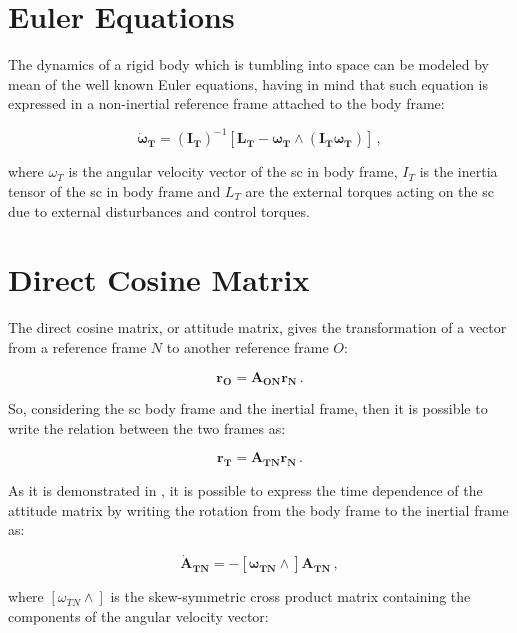\section{Euler Equations}

The dynamics of a rigid body which is tumbling into space can be modeled by mean of the well known Euler equations, having in mind that such equation is expressed in a non-inertial reference frame attached to the body frame:

\begin{equation}
  \dot{\mathbf{\omega}}\mathbf{_T} = \mathbf{(I_T)}^{-1} \left[\mathbf{L_T} - \mathbf{\omega_T}  \wedge (\mathbf{I_T} \mathbf{\omega_T})\right] \,,
\end{equation}

where \textbf{$\omega_T$} is the angular velocity vector of the \acrshort{sc} in body frame, \textbf{$I_T$} is the inertia tensor of the \acrshort{sc} in body frame and \textbf{$L_T$} are the external torques acting on the \acrshort{sc} due to  external disturbances and control torques.

\section{Direct Cosine Matrix}
The direct cosine matrix, or attitude matrix, gives the transformation of a vector from a reference frame $N$ to another reference frame $O$:

\begin{equation}
  \mathbf{r_{O}} = \mathbf{A_{ON}} \mathbf{r_{N}} \,.
\end{equation}

So, considering the \acrshort{sc} body frame and the inertial frame, then it is possible to write the relation between the two frames as:

\begin{equation}
  \mathbf{r_{T}} = \mathbf{A_{TN}} \mathbf{r_{N}} \,.
\end{equation}

As it is demonstrated in \cite{Markley2014}, it is possible to express the time dependence of the attitude matrix by writing the rotation from the body frame to the inertial frame as:

\begin{equation}
  \dot{\mathbf{A}}_\mathbf{TN} = - [\mathbf{\omega_{TN}} \wedge]\mathbf{A_{TN}} \,,
\end{equation}

where $[\omega_{TN} \wedge]$ is the skew-symmetric cross product matrix containing the components of the angular velocity vector:

